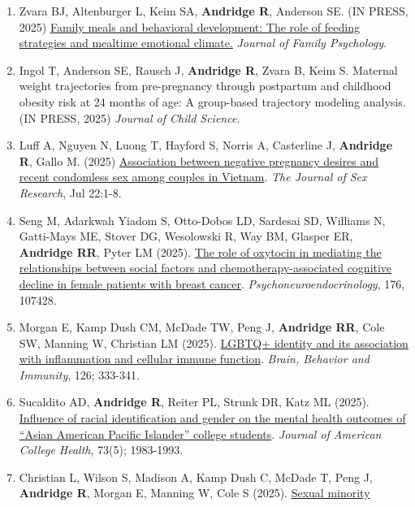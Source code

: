 \documentclass[
  english,
  letterpaper,
  DIV=11,
  numbers=noendperiod]{scrartcl}
\begin{document}
\begin{enumerate}
  Kamp Dush CM. (IN PRESS, 2025) Self-rated health and inflammation:
  Associations among sexual minority and heterosexual adults.
  \emph{Health Psychology}.
\item
  Zvara BJ, Altenburger L, Keim SA, \textbf{Andridge R}, Anderson SE.
  (IN PRESS, 2025) \href{https://doi.org/10.1037/fam0001430}{Family
  meals and behavioral development: The role of feeding strategies and
  mealtime emotional climate.} \emph{Journal of Family Psychology}.
\item
  Ingol T, Anderson SE, Rausch J, \textbf{Andridge R}, Zvara B, Keim S.
  Maternal weight trajectories from pre-pregnancy through postpartum and
  childhood obesity risk at 24 months of age: A group-based trajectory
  modeling analysis. (IN PRESS, 2025) \emph{Journal of Child Science}.
\item
  Luff A, Nguyen N, Luong T, Hayford S, Norris A, Casterline J,
  \textbf{Andridge R}, Gallo M. (2025)
  \href{https://doi.org/10.1080/00224499.2025.2530230}{Association
  between negative pregnancy desires and recent condomless sex among
  couples in Vietnam}. \emph{The Journal of Sex Research}, Jul 22:1-8.
\item
  Seng M, Adarkwah Yiadom S, Otto-Dobos LD, Sardesai SD, Williams N,
  Gatti-Mays ME, Stover DG, Wesolowski R, Way BM, Glasper ER,
  \textbf{Andridge RR}, Pyter LM (2025).
  \href{https://doi.org/10.1016/j.psyneuen.2025.107428}{The role of
  oxytocin in mediating the relationships between social factors and
  chemotherapy-associated cognitive decline in female patients with
  breast cancer}. \emph{Psychoneuroendocrinology}, 176, 107428.
\item
  Morgan E, Kamp Dush CM, McDade TW, Peng J, \textbf{Andridge RR}, Cole
  SW, Manning W, Christian LM (2025).
  \href{https://doi.org/10.1016/j.bbi.2025.02.032}{LGBTQ+ identity and
  its association with inflammation and cellular immune function}.
  \emph{Brain, Behavior and Immunity}, 126; 333-341.
\item
  Sucaldito AD, \textbf{Andridge R}, Reiter PL, Strunk DR, Katz ML
  (2025). \href{https://doi.org/10.1080/07448481.2025.2472210}{Influence
  of racial identification and gender on the mental health outcomes of
  ``Asian American Pacific Islander'' college students}. \emph{Journal
  of American College Health}, 73(5); 1983-1993.
\item
  Christian L, Wilson S, Madison A, Kamp Dush C, McDade T, Peng J,
  \textbf{Andridge R}, Morgan E, Manning W, Cole S (2025).
  \href{https://doi.org/10.1016/j.bbi.2025.01.022}{Sexual minority
}
\end{enumerate}
\end{document}
